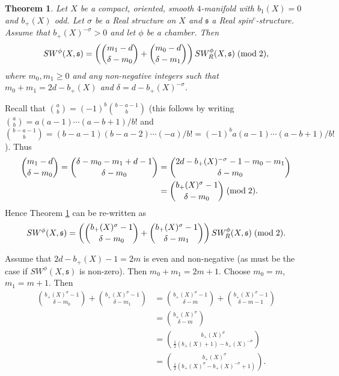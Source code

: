 \documentclass{amsart}
\newtheorem{theorem}{Theorem}[section]
\theoremstyle{definition}
\theoremstyle{remark}
\numberwithin{equation}{section}
\begin{document}
\begin{theorem}\label{thm:loc}
Let $X$ be a compact, oriented, smooth $4$-manifold with $b_1(X) = 0$ and $b_+(X)$ odd. Let $\sigma$ be a Real structure on $X$ and $\mathfrak{s}$ a Real spin$^c$-structure. Assume that $b_+(X)^{-\sigma}>0$ and let $\phi$ be a chamber. Then
\begin{equation}\label{equ:swloc1}
SW^\phi(X,\mathfrak{s}) = \left( \binom{m_1-d}{\delta-m_0} + \binom{m_0-d}{\delta-m_1} \right) SW^\phi_R(X,\mathfrak{s}) \; ({\rm mod} \; 2),
\end{equation}
where $m_0,m_1 \ge 0$ and any non-negative integers such that $m_0 + m_1 = 2d - b_+(X)$ and $\delta = d - b_+(X)^{-\sigma}$.

\end{theorem}


Recall that $\binom{a}{b} = (-1)^b \binom{b-a-1}{b}$ (this follows by writing $\binom{a}{b} = a(a-1) \cdots (a-b+1)/b!$ and $\binom{b-a-1}{b} = (b-a-1)(b-a-2)\cdots (-a)/b! = (-1)^b a(a-1) \cdots (a-b+1)/b!$). Thus
\begin{align*}
\binom{m_1-d}{\delta-m_0}  = \binom{\delta - m_0 - m_1 + d - 1}{\delta-m_0} &= \binom{2d - b_+(X)^{-\sigma} - 1 -m_0 - m_1}{\delta-m_0} \\
&= \binom{ b_+(X)^{\sigma} - 1 }{\delta-m_0} \; ({\rm mod} \; 2).
\end{align*}
Hence Theorem \ref{thm:loc} can be re-written as
\[
SW^\phi(X,\mathfrak{s}) = \left( \binom{b_+(X)^{\sigma} - 1}{\delta-m_0} + \binom{ b_+(X)^{\sigma} -1}{\delta-m_1} \right) SW^\phi_R(X,\mathfrak{s}) \; ({\rm mod} \; 2).
\]

Assume that $2d - b_+(X) - 1 = 2m$ is even and non-negative (as must be the case if $SW^\phi(X,\mathfrak{s})$ is non-zero). Then $m_0 + m_1 = 2m+1$. Choose $m_0 = m$, $m_1 = m+1$. Then 
\begin{align*}
\binom{b_+(X)^{\sigma}-1}{\delta-m_0} + \binom{b_+(X)^{\sigma}-1}{\delta-m_1} &= \binom{b_+(X)^\sigma - 1}{\delta-m} + \binom{b_+(X)^\sigma - 1}{\delta-m-1} \\
& = \binom{b_+(X)^\sigma}{\delta-m} \\
& = \binom{ b_+(X)^\sigma}{ \frac{1}{2}(b_+(X)+1) - b_+(X)^{-\sigma} } \\
& = \binom{b_+(X)^\sigma}{ \frac{1}{2}( b_+(X)^{\sigma} - b_+(X)^{-\sigma} + 1) }.
\end{align*}
\end{document}
